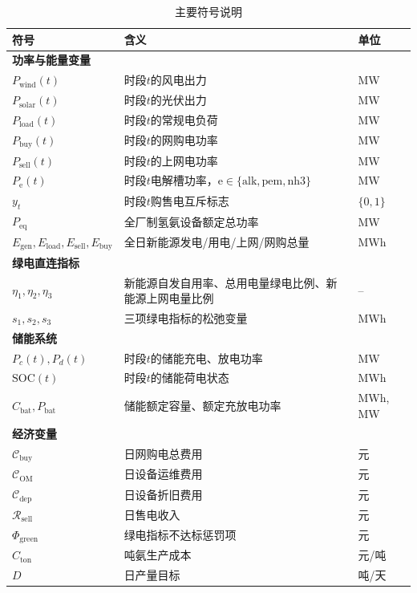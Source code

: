 \documentclass[zihao=-4,a4paper]{ctexart} %
\begin{document}
	\begin{table}[H]
		\centering
		\small
		\begin{tabular}{p{30mm}<{\centering}p{65mm}<{\centering}p{18mm}<{\centering}}
			\toprule
			符号 & 含义 & 单位 \\
			\midrule
			\multicolumn{3}{l}{\textbf{功率与能量变量}} \\
			$P_{\text{wind}}(t)$ & 时段$t$的风电出力 & MW \\
			$P_{\text{solar}}(t)$ & 时段$t$的光伏出力 & MW \\
			$P_{\text{load}}(t)$ & 时段$t$的常规电负荷 & MW \\
			$P_{\text{buy}}(t)$ & 时段$t$的网购电功率 & MW \\
			$P_{\text{sell}}(t)$ & 时段$t$的上网电功率 & MW \\
			$P_{\text{e}}(t)$ & 时段$t$电解槽功率，$\text{e}\in\{\text{alk},\text{pem},\text{nh3}\}$ & MW \\
			$y_t$ & 时段$t$购售电互斥标志 & $\{0,1\}$ \\
			$P_{\text{eq}}$ & 全厂制氢氨设备额定总功率 & MW \\
			$E_{\text{gen}},E_{\text{load}},E_{\text{sell}},E_{\text{buy}}$ & 全日新能源发电/用电/上网/网购总量 & MWh \\
			\midrule
			\multicolumn{3}{l}{\textbf{绿电直连指标}} \\
			$\eta_1,\eta_2,\eta_3$ & 新能源自发自用率、总用电量绿电比例、新能源上网电量比例 & -- \\
			$s_1,s_2,s_3$ & 三项绿电指标的松弛变量 & MWh \\
			\midrule
			\multicolumn{3}{l}{\textbf{储能系统}} \\
			$P_c(t),P_d(t)$ & 时段$t$的储能充电、放电功率 & MW \\
			$\text{SOC}(t)$ & 时段$t$的储能荷电状态 & MWh \\
			$C_{\text{bat}},P_{\text{bat}}$ & 储能额定容量、额定充放电功率 & MWh, MW \\
			\midrule
			\multicolumn{3}{l}{\textbf{经济变量}} \\
			$\mathcal{C}_{\text{buy}}$ & 日网购电总费用 & 元 \\
			$\mathcal{C}_{\text{OM}}$ & 日设备运维费用 & 元 \\
			$\mathcal{C}_{\text{dep}}$ & 日设备折旧费用 & 元 \\
			$\mathcal{R}_{\text{sell}}$ & 日售电收入 & 元 \\
			$\Phi_{\text{green}}$ & 绿电指标不达标惩罚项 & 元 \\
			$C_{\text{ton}}$ & 吨氨生产成本 & 元/吨 \\
			\midrule
			$D$ & 日产量目标 & 吨/天 \\
			\bottomrule
		\end{tabular}
		\caption{主要符号说明}
	\end{table}
	
\end{document}
